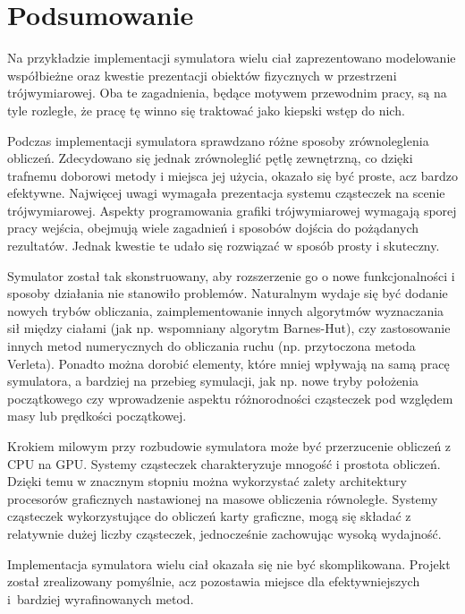 \documentclass[12pt, twoside, openany]{report}
\begin{document}
\chapter{Podsumowanie}

Na przykładzie implementacji symulatora wielu ciał zaprezentowano modelowanie współbieżne oraz kwestie prezentacji obiektów fizycznych w przestrzeni trójwymiarowej. Oba te zagadnienia, będące motywem przewodnim pracy, są na tyle rozległe, że pracę tę winno się traktować jako kiepski wstęp do nich.


Podczas implementacji symulatora sprawdzano różne sposoby zrównoleglenia obliczeń. Zdecydowano się jednak zrównoleglić pętlę zewnętrzną, co dzięki trafnemu doborowi metody i miejsca jej użycia, okazało się być proste, acz bardzo efektywne. Najwięcej uwagi wymagała prezentacja systemu cząsteczek na scenie trójwymiarowej. Aspekty programowania grafiki trójwymiarowej wymagają sporej pracy wejścia, obejmują wiele zagadnień i sposobów dojścia do pożądanych rezultatów. Jednak kwestie te udało się rozwiązać w sposób prosty i skuteczny.

Symulator został tak skonstruowany, aby rozszerzenie go o nowe funkcjonalności i sposoby działania nie stanowiło problemów. Naturalnym wydaje się być dodanie nowych trybów obliczania, zaimplementowanie innych algorytmów wyznaczania sił między ciałami (jak np. wspomniany algorytm Barnes-Hut), czy zastosowanie innych metod numerycznych do obliczania ruchu (np. przytoczona metoda Verleta). Ponadto można dorobić elementy, które mniej wpływają na samą pracę symulatora, a bardziej na przebieg symulacji, jak np. nowe tryby położenia początkowego czy wprowadzenie aspektu różnorodności cząsteczek pod względem masy lub prędkości początkowej.

Krokiem milowym przy rozbudowie symulatora może być przerzucenie obliczeń z CPU na GPU. Systemy cząsteczek charakteryzuje  mnogość i prostota obliczeń. Dzięki temu w znacznym stopniu można wykorzystać zalety architektury procesorów graficznych nastawionej na masowe obliczenia równoległe. Systemy cząsteczek wykorzystujące do obliczeń karty graficzne, mogą się składać z relatywnie dużej liczby cząsteczek, jednocześnie zachowując wysoką wydajność.

Implementacja symulatora wielu ciał okazała się nie być skomplikowana. Projekt został zrealizowany pomyślnie, acz pozostawia miejsce dla efektywniejszych i~bardziej wyrafinowanych metod.

\end{document}
